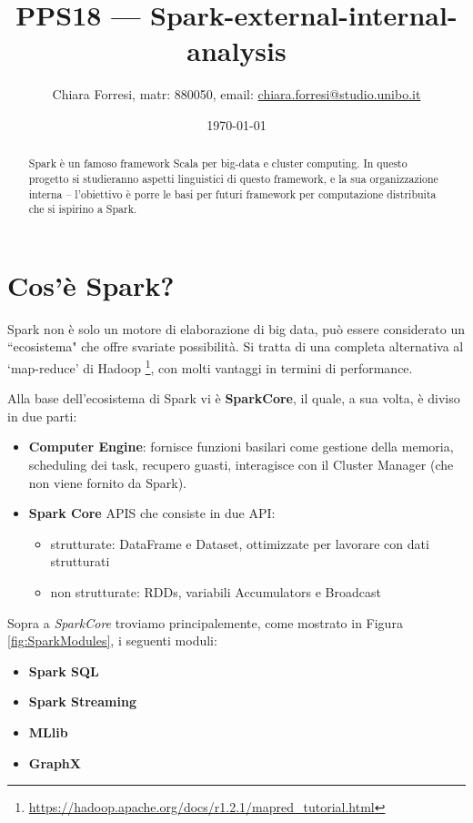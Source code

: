 \documentclass[12pt,italian]{article}
\title{PPS18  --- Spark-external-internal-analysis}
\author{Chiara Forresi, matr: 880050, email: {\url{chiara.forresi@studio.unibo.it}}}
\date{\today}
\begin{document}
\begin{titlingpage}
	\maketitle
	\begin{abstract}
		Spark è un famoso framework Scala per big-data e cluster computing. In questo progetto si studieranno aspetti linguistici di questo framework, e la sua organizzazione interna -- l'obiettivo è porre le basi per futuri framework per computazione distribuita che si ispirino a Spark.
	\end{abstract}
\end{titlingpage}
\nocite{*}
\tableofcontents
\newpage

\section{Cos'è Spark?}
Spark non è solo un motore di elaborazione di big data, può essere considerato un ``ecosistema" che offre svariate possibilità.
Si tratta di una completa alternativa al `map-reduce' di Hadoop \footnote{\url{https://hadoop.apache.org/docs/r1.2.1/mapred\_tutorial.html}}, con molti vantaggi in termini di performance. 
\par Alla base dell'ecosistema di Spark vi è \textbf{SparkCore}, il quale, a sua volta, è diviso in due parti:
\begin{itemize}
	\item \textbf{Computer Engine}: fornisce funzioni basilari come gestione della memoria, scheduling dei task, recupero guasti, interagisce con il Cluster Manager (che non viene fornito da Spark).
	\item \textbf{Spark Core} APIS che consiste in due API:
	\begin{itemize}
		\item strutturate: DataFrame e Dataset, ottimizzate per lavorare con dati strutturati
		\item non strutturate: RDDs, variabili Accumulators e Broadcast
	\end{itemize}
\end{itemize}
Sopra a \textit{SparkCore} troviamo principalemente, come mostrato in Figura \ref{fig:SparkModules}, i seguenti moduli:
\begin{itemize}
	\item \textbf{Spark SQL}
	\item  \textbf{Spark Streaming}
	\item \textbf{MLlib}
	\item \textbf{GraphX}
\end{itemize}
\end{document}
